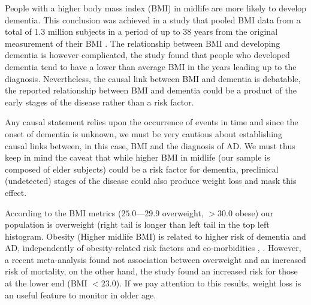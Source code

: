 \documentclass[11pt]{article}
\theoremstyle{definition}
\theoremstyle{remark}
\begin{document}

People with a higher body mass index (BMI) in midlife are more likely to develop dementia. This conclusion was achieved in a study that pooled BMI data from a total of 1.3 million subjects in a period of up to 38 years from the original measurement of their BMI \cite{kivimaki2018body}. 
The relationship between BMI and developing dementia is however complicated, the study found that people who developed dementia tend to have a lower than average BMI in the years leading up to the diagnosis. 
Nevertheless, the causal link between BMI and dementia is debatable, the reported relationship between BMI and dementia could be a product of the early stages of the disease rather than a risk factor. 

Any causal statement relies upon the occurrence of events in time and since the onset of dementia is unknown, we must be very cautious about establishing causal links between, in this case, BMI and the diagnosis of AD.   
We must thus keep in mind the caveat that while higher BMI in midlife (our sample is composed of elder subjects) 
could be a risk factor for dementia, preclinical (undetected) stages of the disease could also produce weight loss and mask this effect. 


According to the BMI metrics ($25.0—29.9$ overweight, $>30.0$ obese) our population is overweight (right tail is longer than left tail in the top left histogram. Obesity (Higher midlife BMI) is related to higher risk of dementia and AD, independently of obesity-related risk factors and co-morbidities \cite{tolppanen2014midlife}, \cite{nepal2014rising}. However, a recent meta-analysis \cite{winter2014bmi} found not association between overweight and an increased risk of mortality, on the other hand, the study found an increased risk for those at the lower end (BMI $< 23.0$). If we pay attention to this results, weight loss is an useful feature to monitor in older age.
\end{document}
